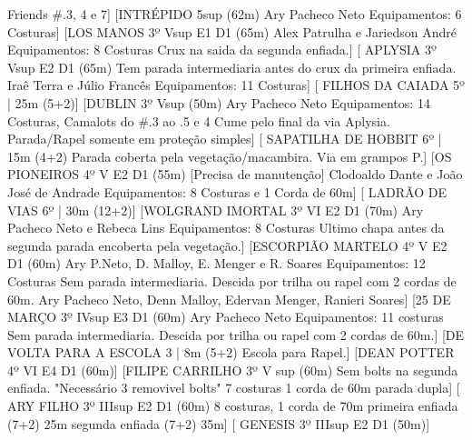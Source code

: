 \begin{CGSectorRoutes}
Friends \#.3, 4 e 7]
    [INTRÉPIDO 5sup (62m) Ary Pacheco Neto Equipamentos: 6 Costuras]
    [LOS MANOS 3º Vsup E1 D1 (65m) Alex Patrulha e Jariedson André Equipamentos: 8 Costuras Crux na saida da segunda enfiada.]
    [ APLYSIA 3º Vsup E2 D1 (65m) Tem parada intermediaria antes do crux da primeira enfiada. Iraê Terra e Júlio Francês Equipamentos: 11 Costuras]
    [ FILHOS DA CAIADA 5º | 25m (5+2)]
    [DUBLIN 3º Vsup (50m) Ary Pacheco Neto Equipamentos: 14 Costuras, Camalots do \#.3 ao .5 e 4 Cume pelo final da via Aplysia. Parada/Rapel somente em proteção simples]
    [ SAPATILHA DE HOBBIT 6º | 15m (4+2) Parada coberta pela vegetação/macambira. Via em grampos P.]
    [OS PIONEIROS 4º V E2 D1 (55m) [Precisa de manutenção] Clodoaldo Dante e João José de Andrade Equipamentos: 8 Costuras e 1 Corda de 60m]
    [ LADRÃO DE VIAS 6º | 30m (12+2)]
    [WOLGRAND IMORTAL 3º VI E2 D1 (70m) Ary Pacheco Neto e Rebeca Lins Equipamentos: 8 Costuras Ultimo chapa antes da segunda parada encoberta pela vegetação.]
    [ESCORPIÃO MARTELO 4º V E2 D1 (60m) Ary P.Neto, D. Malloy, E. Menger e R. Soares Equipamentos: 12 Costuras Sem parada intermediaria. Descida por trilha ou rapel com 2 cordas de 60m. Ary Pacheco Neto, Denn Malloy, Edervan Menger, Ranieri Soares]
    [25 DE MARÇO 3º IVsup E3 D1 (60m) Ary Pacheco Neto Equipamentos: 11 costuras Sem parada intermediaria. Descida por trilha ou rapel com 2 cordas de 60m.]
    [DE VOLTA PARA A ESCOLA 3 | 8m (5+2) Escola para Rapel.]
    [DEAN POTTER 4º VI E4 D1 (60m)]
    [FILIPE CARRILHO 3º V sup (60m) Sem bolts na segunda enfiada. "Necessário 3 removivel bolts"
7 costuras
1 corda de 60m
parada dupla]
    [ ARY FILHO 3º IIIsup E2 D1 (60m) 8 costuras, 
1 corda de 70m primeira enfiada (7+2) 25m segunda enfiada (7+2) 35m]
    [ GENESIS 3º IIIsup E2 D1 (50m)]

\end{CGSectorRoutes}
